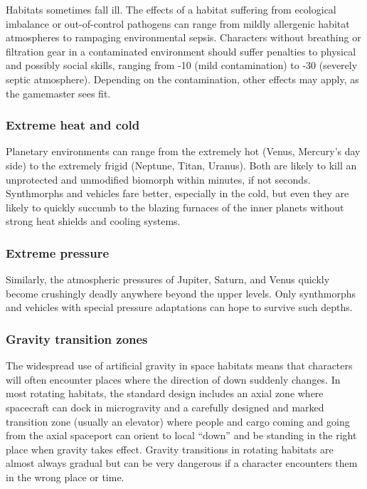 Habitats sometimes fall ill. The effects of a habitat suffering from ecological imbalance or out-of-control pathogens can range from mildly allergenic habitat atmospheres to rampaging environmental sepsis. Characters without breathing or filtration gear in a contaminated environment should suffer penalties to physical and possibly social skills, ranging from -10 (mild contamination) to -30 (severely septic atmosphere). Depending on the contamination, other effects may apply, as the gamemaster sees fit.

\subsubsection{Extreme heat and cold}

Planetary environments can range from the extremely hot (Venus, Mercury’s day side) to the extremely frigid (Neptune, Titan, Uranus). Both are likely to kill an unprotected and unmodified biomorph within minutes, if not seconds. Synthmorphs and vehicles fare better, especially in the cold, but even they are likely to quickly succumb to the blazing furnaces of the inner planets without strong heat shields and cooling systems.

\subsubsection{Extreme pressure}

Similarly, the atmospheric pressures of Jupiter, Saturn, and Venus quickly become crushingly deadly anywhere beyond the upper levels. Only synthmorphs and vehicles with special pressure adaptations can hope to survive such depths.

\subsubsection{Gravity transition zones}

The widespread use of artificial gravity in space habitats means that characters will often encounter places where the direction of down suddenly changes. In most rotating habitats, the standard design includes an axial zone where spacecraft can dock in microgravity and a carefully designed and marked transition zone (usually an elevator) where people and cargo coming and going from the axial spaceport can orient to local ``down'' and be standing in the right place when gravity takes effect. Gravity transitions in rotating habitats are almost always gradual but can be very dangerous if a character encounters them in the wrong place or time.


